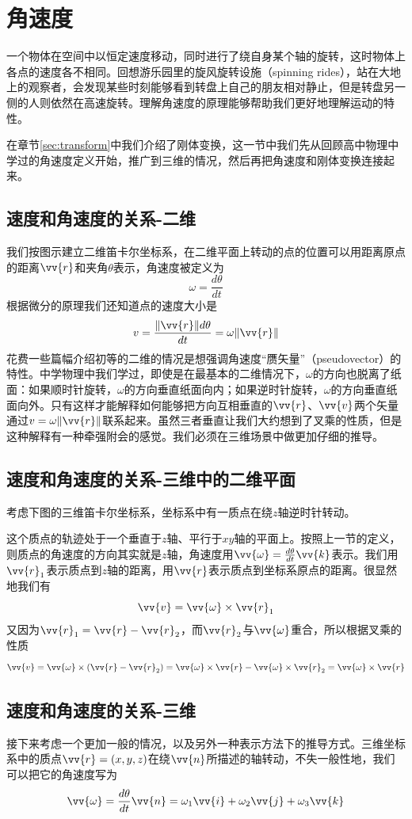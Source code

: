 \documentclass[11pt]{article}
\begin{document}
\section{角速度}\label{sec:angular}
一个物体在空间中以恒定速度移动，同时进行了绕自身某个轴的旋转，这时物体上各点的速度各不相同。回想游乐园里的旋风旋转设施（spinning rides），站在大地上的观察者，会发现某些时刻能够看到转盘上自己的朋友相对静止，但是转盘另一侧的人则依然在高速旋转。理解角速度的原理能够帮助我们更好地理解运动的特性。

在章节\ref{sec:transform}中我们介绍了刚体变换，这一节中我们先从回顾高中物理中学过的角速度定义开始，推广到三维的情况，然后再把角速度和刚体变换连接起来。
\subsection{速度和角速度的关系-二维}	
我们按图示建立二维笛卡尔坐标系，在二维平面上转动的点的位置可以用距离原点的距离$\vv{r}$和夹角$\theta$表示，角速度被定义为
$$
\omega = \frac{d\theta}{dt}
$$
根据微分的原理我们还知道点的速度大小是
$$
v = \frac{\|\vv{r}\|d\theta}{dt} = \omega \|\vv{r}\|
$$
花费一些篇幅介绍初等的二维的情况是想强调角速度“赝矢量”（pseudovector）的特性。中学物理中我们学过，即使是在最基本的二维情况下，$\omega$的方向也脱离了纸面：如果顺时针旋转，$\omega$的方向垂直纸面向内；如果逆时针旋转，$\omega$的方向垂直纸面向外。只有这样才能解释如何能够把方向互相垂直的$\vv{r}$、$\vv{v}$两个矢量通过$v = \omega \|\vv{r}\|$联系起来。虽然三者垂直让我们大约想到了叉乘的性质，但是这种解释有一种牵强附会的感觉。我们必须在三维场景中做更加仔细的推导。

\subsection{速度和角速度的关系-三维中的二维平面}	\label{sec:velandw}
考虑下图的三维笛卡尔坐标系，坐标系中有一质点在绕$z$轴逆时针转动。

这个质点的轨迹处于一个垂直于$z$轴、平行于$xy$轴的平面上。按照上一节的定义，则质点的角速度的方向其实就是$z$轴，角速度用$\vv{\omega} = \frac{d\theta}{dt}\vv{k}$表示。我们用$\vv{r}_1$表示质点到$z$轴的距离，用$\vv{r}$表示质点到坐标系原点的距离。很显然地我们有
$$
\vv{v} = \vv{\omega} \times \vv{r}_1
$$
又因为$\vv{r}_1 = \vv{r} - \vv{r}_2$，而$\vv{r}_2$与$\vv{\omega}$重合，所以根据叉乘的性质
$$
\vv{v} = \vv{\omega} \times (\vv{r} - \vv{r}_2) = \vv{\omega} \times \vv{r} - \vv{\omega} \times \vv{r}_2 = \vv{\omega} \times \vv{r}
$$
\subsection{速度和角速度的关系-三维}\label{sec:velandangular3d}
接下来考虑一个更加一般的情况，以及另外一种表示方法下的推导方式。三维坐标系中的质点$\vv{r} = (x,y,z)$在绕$\vv{n}$所描述的轴转动，不失一般性地，我们可以把它的角速度写为
\begin{equation}\label{eqn:omegadef}
\vv{\omega} = \frac{d\theta}{dt}\vv{n} = \omega_1\vv{i}+\omega_2\vv{j}+\omega_3\vv{k}
\end{equation}
\end{document}
